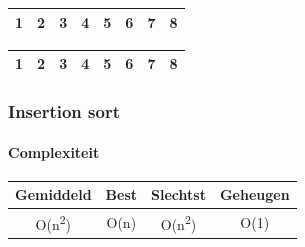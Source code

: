 \begin{frame}
\begin{table}
\begin{tabular}{| c | c | c | c | c | c | c | c |}
\hline
\end{tabular}
\end{table}
\begin{table}
\begin{tabular}{| c | c | c | c | c | c | c | c |}
\hline
\cellcolor{blue!25}1 & \cellcolor{blue!25}2 & \cellcolor{blue!25}3 & \cellcolor{red!25}4 & \cellcolor{blue!25}5 & \cellcolor{blue!25}6 & \cellcolor{blue!25}7 & \cellcolor{blue!25}8 \\ 
\hline
\end{tabular}
\end{table}
\begin{table}
\begin{tabular}{| c | c | c | c | c | c | c | c |}
\hline
\cellcolor{blue!25}1 & \cellcolor{blue!25}2 & \cellcolor{blue!25}3 & \cellcolor{blue!25}4 & \cellcolor{blue!25}5 & \cellcolor{blue!25}6 & \cellcolor{blue!25}7 & \cellcolor{blue!25}8 \\ 
\hline
\end{tabular}
\end{table}
\end{frame}

\begin{frame}
\frametitle{Insertion sort}
\framesubtitle{Complexiteit}
\begin{table}
\begin{tabular}{| c | c | c | c |}
\hline
Gemiddeld & Best & Slechtst & Geheugen\\ 
\hline
O(n\textsuperscript{2}) & O(n) & O(n\textsuperscript{2}) & O(1)\\
\hline
\end{tabular}
\end{table}
\end{frame}